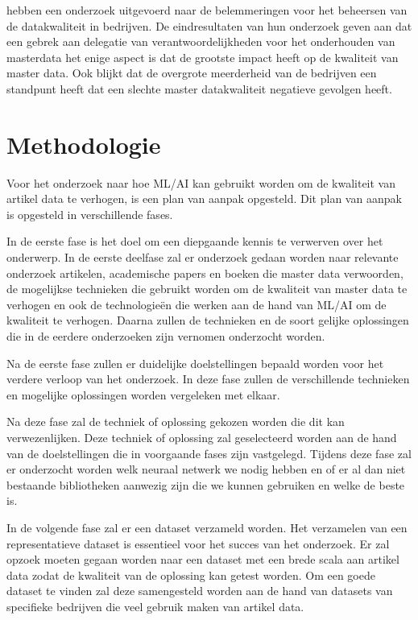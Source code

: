 \textcite{ Haug2011a} hebben een onderzoek uitgevoerd naar de belemmeringen voor het beheersen van de datakwaliteit in bedrijven. De eindresultaten van hun onderzoek geven aan dat een gebrek aan delegatie van verantwoordelijkheden voor het onderhouden van masterdata het enige aspect is dat de grootste impact heeft op de kwaliteit van master data. Ook blijkt dat de overgrote meerderheid van de bedrijven een standpunt heeft dat een slechte master datakwaliteit negatieve gevolgen heeft. 

\section{Methodologie}%
\label{sec:methodologie}

Voor het onderzoek naar hoe ML/AI kan gebruikt worden om de kwaliteit van artikel data te verhogen, is een plan van aanpak opgesteld. Dit plan van aanpak is opgesteld in verschillende fases. 

In de eerste fase is het doel om een diepgaande kennis te verwerven over het onderwerp. In de eerste deelfase zal er onderzoek gedaan worden naar relevante onderzoek artikelen, academische papers en boeken die master data verwoorden, de mogelijkse technieken die gebruikt worden om de kwaliteit van master data te verhogen en ook de technologieën die werken aan de hand van ML/AI om de kwaliteit te verhogen. Daarna zullen de technieken en de soort gelijke oplossingen die in de eerdere onderzoeken zijn vernomen onderzocht worden. 

Na de eerste fase zullen er duidelijke doelstellingen bepaald worden voor het verdere verloop van het onderzoek. In deze fase zullen de verschillende technieken en mogelijke oplossingen worden vergeleken met elkaar. %

Na deze fase zal de techniek of oplossing gekozen worden die dit kan verwezenlijken. Deze techniek of oplossing zal geselecteerd worden aan de hand van de doelstellingen die in voorgaande fases zijn vastgelegd. Tijdens deze fase zal er onderzocht worden welk neuraal netwerk we nodig hebben en of er al dan niet bestaande bibliotheken aanwezig zijn die we kunnen gebruiken en welke de beste is. 

In de volgende fase zal er een dataset verzameld worden. Het verzamelen van een representatieve dataset is essentieel voor het succes van het onderzoek. Er zal opzoek moeten gegaan worden naar een dataset met een brede scala aan artikel data zodat de kwaliteit van de oplossing kan getest worden. Om een goede dataset te vinden zal deze samengesteld worden aan de hand van datasets van specifieke bedrijven die veel gebruik maken van artikel data.

